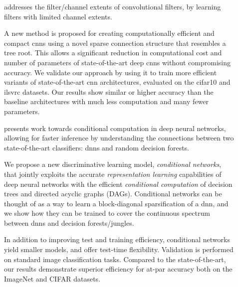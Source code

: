 \documentclass[thesis]{subfiles}
\begin{document}
\begin{description}
	\item[] addresses the filter/channel extents of convolutional filters, by learning filters with limited channel extents. 
	
	A new method is proposed for creating computationally efficient and compact \glspl{cnn} using a novel sparse connection structure that resembles a tree root. This allows a significant reduction in computational cost and number of parameters of state-of-the-art deep \glspl{cnn} without compromising accuracy. We validate our approach by using it to train more efficient variants of state-of-the-art \gls{cnn} architectures, evaluated on the \gls{cifar10} and \gls{ilsvrc} datasets. Our results show similar or higher accuracy than the baseline architectures with much less computation and many fewer parameters. %
	
	\item[] presents work towards conditional computation in deep neural networks, allowing for faster inference by understanding the connections between two state-of-the-art classifiers: \glspl{dnn} and random decision forests.
	
	We propose a new discriminative learning model, \emph{conditional networks}, 
	that jointly exploits the accurate \emph{representation learning} capabilities of deep neural networks with the efficient \emph{conditional computation} of decision trees and directed acyclic graphs (DAGs).
	Conditional networks can be thought of as a way to learn a block-diagonal sparsification of a \gls{dnn}, and we show how they can be trained to cover the continuous spectrum between \glspl{dnn} and decision forests/jungles. 
	
	In addition to improving test and training efficiency, conditional networks yield smaller models, and offer test-time flexibility. Validation is performed on standard image classification tasks. Compared to the state-of-the-art, our results demonstrate superior efficiency for at-par accuracy both on the ImageNet and CIFAR datasets.
	

\end{description}
\end{document}
